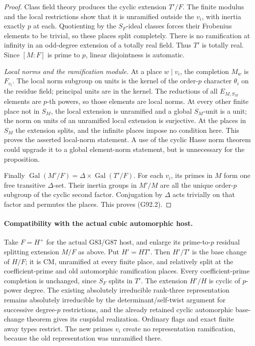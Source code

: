 \begin{proof}
Class field theory produces the cyclic extension \(T'/F\).
The finite modulus and the local restrictions show that it is
unramified outside the \(v_i\), with inertia exactly \(p\) at each.
Quotienting by the \(S_F\)-ideal classes forces their Frobenius
elements to be trivial, so these places split completely.
There is no ramification at infinity in an odd-degree extension
of a totally real field.  Thus \(T'\) is totally real.
Since \([M:F]\) is prime to \(p\), linear disjointness is automatic.

\emph{Local norms and the ramification module.}
At a place \(w\mid v_i\), the completion \(M_w\) is \(F_{v_i}\).
The local norm subgroup on units is the kernel of the order-\(p\)
character \(\theta_i\) on the residue field; principal units are in
the kernel.  The reductions of all \(E_{M,S_M}\) elements are
\(p\)-th powers, so those elements are local norms.
At every other finite place not in \(S_M\), the local extension is
unramified and a global \(S_M\)-unit is a unit; the norm on units
of an unramified local extension is surjective.
At the places in \(S_M\) the extension splits, and the infinite
places impose no condition here.  This proves the asserted
local-norm statement.  A use of the cyclic Hasse norm theorem could
upgrade it to a global element-norm statement, but is unnecessary
for the proposition.

Finally
\(\operatorname{Gal}(M'/F)=\Delta\times\operatorname{Gal}(T'/F)\).
For each \(v_i\), its primes in \(M\) form one free transitive
\(\Delta\)-set.  Their inertia groups in \(M'/M\) are all the
unique order-\(p\) subgroup of the cyclic second factor.
Conjugation by \(\Delta\) acts trivially on that factor and
permutes the places.  This proves (G92.2).
\end{proof}

\paragraph{Compatibility with the actual cubic automorphic host.}
Take \(F=H^+\) for the actual G83/G87 host, and enlarge its
prime-to-\(p\) residual splitting extension \(M/F\) as above.
Put \(H'=HT'\).  Then \(H'/T'\) is the base change of \(H/F\);
it is CM, unramified at every finite place, and relatively split
at the coefficient-prime and old automorphic ramification places.
Every coefficient-prime completion is unchanged, since \(S_F\)
splits in \(T'\).
The extension \(H'/H\) is cyclic of \(p\)-power degree.
The existing absolutely irreducible rank-three representation
remains absolutely irreducible by the determinant/self-twist
argument for successive degree-\(p\) restrictions, and the already
retained cyclic automorphic base-change theorem gives its
cuspidal realization.  Ordinary flags and exact finite away
types restrict.  The new primes \(v_i\) create no representation
ramification, because the old representation was unramified
there.


